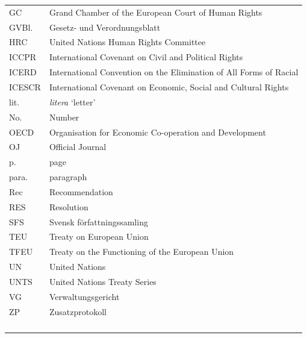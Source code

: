 \documentclass[output=paper,colorlinks,citecolor=brown]{langscibook}
\begin{document}
\begin{tabularx}{.49\textwidth}{lQ}
GC & Grand Chamber of the European Court of Human Rights \\
GVBl. & Gesetz- und Verordnungsblatt \\
HRC & United Nations Human Rights Committee \\
ICCPR & International Covenant on Civil and Political Rights \citep{un_iccpr_1966}\\
ICERD & International Convention on the Elimination of All Forms of Racial  \citep{un_icerd_1965}\\
ICESCR & International Covenant on Economic, Social and Cultural Rights \citep{un_icescr_1976}\\
lit. & \textit{litera} `letter' \\
No. & Number \\
OECD & Organisation for Economic Co-operation and Development \\
OJ & Official Journal \\
p. & page \\
para. & paragraph \\
Rec & Recommendation \\
RES & Resolution \\
SFS & Svensk författningssamling \\
TEU & Treaty on European Union \citep{teu1992}\\
TFEU & Treaty on the Functioning of the European Union \citep{tfeu2016}\\
UN & United Nations \\
UNTS & United Nations Treaty Series \\
VG & Verwaltungsgericht \\
ZP & Zusatzprotokoll \\
  & \\
  & \\
  & \\
  & \\
\end{tabularx}

\normalsize
\sloppy
\printbibliography[heading=subbibliography,notkeyword=this]
\end{document}
